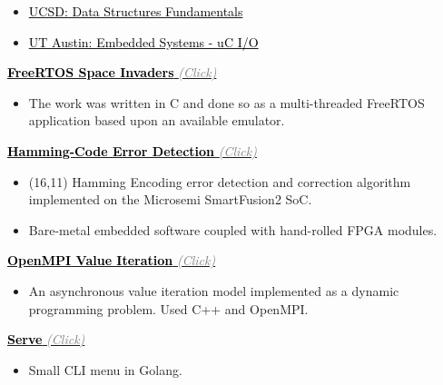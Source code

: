 \documentclass[10pt,a4paper,ragged2e,withhyper]{altacv}
\begin{document}
\begin{paracol}{2}

\divider

\divider

\divider


\begin{itemize}
	\item \href{https://courses.edx.org/certificates/f9250573933e4a3e87e8b28ea989bf99}{{\textcolor{black}{UCSD: Data Structures Fundamentals}}}
	\item \href{https://courses.edx.org/certificates/af6115bce0c646aa95f6aaa6c98acb09}{{\textcolor{black}{UT Austin: Embedded Systems - uC I/O}}}
\end{itemize}



\href{https://github.com/duclos-cavalcanti/FreeRTOS-SpaceInvaders}
     {\textbf{{\textcolor{black}{FreeRTOS Space Invaders}}} \textit{\textcolor{gray}{(Click)}}}
\begin{itemize}
	\item The work was written in C and done so as a multi-threaded FreeRTOS application based upon an available emulator. 
\end{itemize}

\href{https://github.com/duclos-cavalcanti/microsemi-error-detection}
     {\textbf{{\textcolor{black}{Hamming-Code Error Detection}}} \textit{\textcolor{gray}{(Click)}}}
\begin{itemize}
    \item (16,11) Hamming Encoding error detection and correction algorithm implemented on the Microsemi SmartFusion2 SoC.
    \item Bare-metal embedded software coupled with hand-rolled FPGA modules.
\end{itemize}

\href{https://github.com/duclos-cavalcanti/Open-MPI-ValueIteration}
     {\textbf{{\textcolor{black}{OpenMPI Value Iteration}}} \textit{\textcolor{gray}{(Click)}}}
\begin{itemize}
	\item An asynchronous value iteration model implemented as a dynamic programming problem. Used C++ and OpenMPI.
\end{itemize}

\href{https://github.com/duclos-cavalcanti/serve}
     {\textbf{{\textcolor{black}{Serve}}} \textit{\textcolor{gray}{(Click)}}}
\begin{itemize}
	\item Small CLI menu in Golang.
\end{itemize}

\end{paracol}
\end{document}
